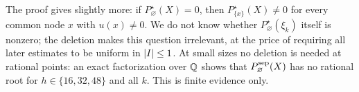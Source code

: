 \begin{remark}\label{rem:nonvanishing}
The proof gives slightly more: if $P^\star_\varnothing(X)=0$, then $P^\star_{\{x\}}(X)\ne0$ for
every common node $x$ with $u(x)\ne0$. We do not know whether $P^\star_\varnothing(\xi_k)$ itself
is nonzero; the deletion makes this question irrelevant, at the price of requiring all later
estimates to be uniform in $\lvert I\rvert\le1$. At small sizes no deletion is needed at rational points:
an exact factorization over $\mathbb{Q}$ shows that $P^{\mathrm{sep}}_\varnothing(X)$ has no rational root for
$h\in\{16,32,48\}$ and all $k$. This is finite evidence only.
\end{remark}
